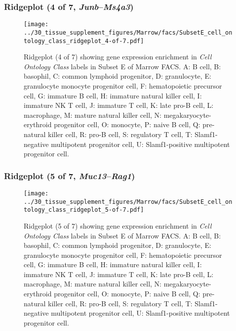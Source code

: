 \subsubsection{Ridgeplot (4 of 7, \emph{Junb}--\emph{Ms4a3})}
\begin{figure}[h]
\centering
\texttt{[image: ../30\_tissue\_supplement\_figures/Marrow/facs/SubsetE\_cell\_ontology\_class\_ridgeplot\_4-of-7.pdf]}

\caption{ Ridgeplot (4 of 7)  showing gene expression enrichment in \emph{Cell Ontology Class} labels in Subset E of Marrow FACS. A: B cell, B: basophil, C: common lymphoid progenitor, D: granulocyte, E: granulocyte monocyte progenitor cell, F: hematopoietic precursor cell, G: immature B cell, H: immature natural killer cell, I: immature NK T cell, J: immature T cell, K: late pro-B cell, L: macrophage, M: mature natural killer cell, N: megakaryocyte-erythroid progenitor cell, O: monocyte, P: naive B cell, Q: pre-natural killer cell, R: pro-B cell, S: regulatory T cell, T: Slamf1-negative multipotent progenitor cell, U: Slamf1-positive multipotent progenitor cell.}
\end{figure}


\clearpage

\subsubsection{Ridgeplot (5 of 7, \emph{Muc13}--\emph{Rag1})}
\begin{figure}[h]
\centering
\texttt{[image: ../30\_tissue\_supplement\_figures/Marrow/facs/SubsetE\_cell\_ontology\_class\_ridgeplot\_5-of-7.pdf]}

\caption{ Ridgeplot (5 of 7)  showing gene expression enrichment in \emph{Cell Ontology Class} labels in Subset E of Marrow FACS. A: B cell, B: basophil, C: common lymphoid progenitor, D: granulocyte, E: granulocyte monocyte progenitor cell, F: hematopoietic precursor cell, G: immature B cell, H: immature natural killer cell, I: immature NK T cell, J: immature T cell, K: late pro-B cell, L: macrophage, M: mature natural killer cell, N: megakaryocyte-erythroid progenitor cell, O: monocyte, P: naive B cell, Q: pre-natural killer cell, R: pro-B cell, S: regulatory T cell, T: Slamf1-negative multipotent progenitor cell, U: Slamf1-positive multipotent progenitor cell.}
\end{figure}


\clearpage

